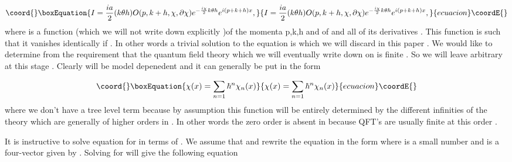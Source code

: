 \documentclass[a4paper,12pt]{article}
\begin{document}
\begin{equation}\coord{}\boxEquation{
I=\frac{ia}{2}(k{\theta}h)O(p,k+h,{\chi},{\partial}{\chi})e^{-\frac{i{\chi}}{2}k{\theta}h}e^{i(p+k+h)x},
}{
I=\frac{ia}{2}(k{\theta}h)O(p,k+h,{\chi},{\partial}{\chi})e^{-\frac{i{\chi}}{2}k{\theta}h}e^{i(p+k+h)x},
}{ecuacion}\coordE{}\end{equation}
where \coordHE{} is a function (which we will not write down explicitly
)of the momenta p,k,h and of \myHighlight{${\chi}$}\coordHE{} and all of its derivatives
\myHighlight{$\{{\partial}{\chi}\}$}\coordHE{} . This function \coordHE{} is such that it
vanishes identically if \coordHE{} . In other
words a trivial solution to the equation \coordHE{} is
\coordHE{} which we will discard in this paper . We would
like to determine \myHighlight{${\chi}$}\coordHE{} from the requirement that the quantum
field theory which we will eventually write
 down on \coordHE{} is finite . So we will leave \myHighlight{${\chi}$}\coordHE{} arbitrary at this stage .
 Clearly \myHighlight{${\chi}$}\coordHE{} will be model depenedent and it can generally be put in the form

\begin{equation}\coord{}\boxEquation{
{\chi}(x)=\sum_{n=1}{\hbar}^n{\chi}_n(x)
}{
{\chi}(x)=\sum_{n=1}{\hbar}^n{\chi}_n(x)
}{ecuacion}\coordE{}\end{equation}
where we don't have a tree level term because by assumption this function will be entirely determined by the different
 infinities of the theory which are generally of higher orders in \myHighlight{$\hbar$}\coordHE{} . In other words
 the zero order is absent in \coordHE{} because QFT's are usually finite at this order .

It is instructive to solve equation \coordHE{} for \myHighlight{${\theta}$}\coordHE{} in
terms of \myHighlight{${\chi}$}\coordHE{} . We assume that
\coordHE{} and rewrite the equation \coordHE{}
in the form \coordHE{}  where
\myHighlight{${\lambda}$}\coordHE{} is a small number and \coordHE{} is a four-vector given by
\coordHE{} . Solving \coordHE{} for \myHighlight{${\theta}$}\coordHE{} will give
  the following equation
\end{document}

